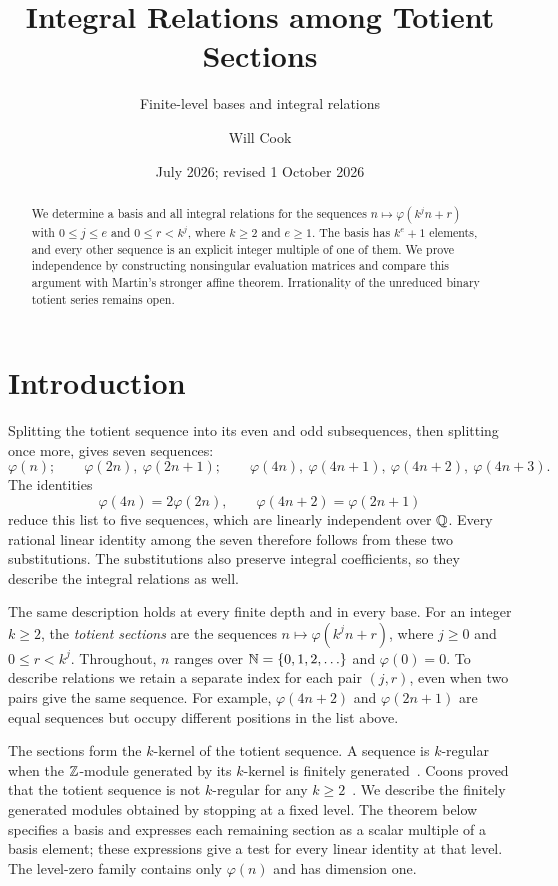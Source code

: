 \documentclass[11pt]{article}
\title{Integral Relations among Totient Sections}
\subtitle{Finite-level bases and integral relations}
\author{Will Cook}
\date{July 2026; revised 1 October 2026}
\begin{document}
\maketitle
\noteprovenance

\begin{abstract}
We determine a basis and all integral relations for the sequences
$n\mapsto\varphi(k^jn+r)$ with $0\le j\le e$ and $0\le r<k^j$,
where $k\ge2$ and $e\ge1$. The basis has $k^e+1$ elements, and
every other sequence is an explicit integer multiple of one of them.
We prove independence by constructing nonsingular evaluation matrices
and compare this argument with Martin's stronger affine theorem.
Irrationality of the unreduced
binary totient series remains open.
\end{abstract}

\section{Introduction}\label{sec:results}
Splitting the totient sequence into its even and odd subsequences,
then splitting once more, gives seven sequences:
\[
 \varphi(n);\qquad
 \varphi(2n),\ \varphi(2n+1);\qquad
 \varphi(4n),\ \varphi(4n+1),\ \varphi(4n+2),\ \varphi(4n+3).
\]
The identities
\[
 \varphi(4n)=2\varphi(2n),\qquad
 \varphi(4n+2)=\varphi(2n+1)
\]
reduce this list to five sequences, which are linearly independent
over $\mathbb{Q}$. Every rational linear identity among the seven therefore
follows from these two substitutions. The substitutions also preserve
integral coefficients, so they describe the integral relations as well.

The same description holds at every finite depth and in every base.
For an integer $k\ge2$, the \emph{totient sections} are the sequences
$n\mapsto\varphi(k^jn+r)$, where $j\ge0$ and $0\le r<k^j$.
Throughout, $n$ ranges over $\mathbb{N}=\{0,1,2,\ldots\}$ and
$\varphi(0)=0$. To describe relations we retain a separate index for
each pair $(j,r)$, even when two pairs give the same sequence.
For example, $\varphi(4n+2)$ and $\varphi(2n+1)$ are equal sequences
but occupy different positions in the list above.

The sections form the $k$-kernel of the totient sequence. A sequence is
$k$-regular when the $\mathbb{Z}$-module generated by its $k$-kernel is finitely
generated~\cite{allouche-shallit}. Coons proved that the totient sequence is
not $k$-regular for any $k\ge2$~\cite[Thm.~3.2]{coons}.
We describe the finitely generated modules obtained by stopping at a
fixed level. The theorem below specifies a basis and expresses each
remaining section as a scalar multiple of a basis element; these
expressions give a test for every linear identity at that level. The level-zero family contains only $\varphi(n)$
and has dimension one.
\end{document}
